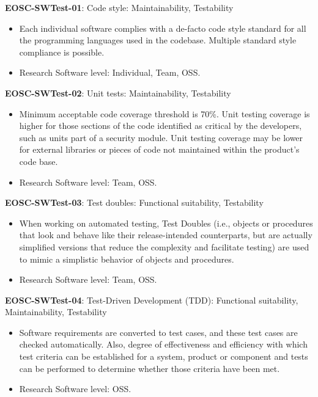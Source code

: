 \textbf{EOSC-SWTest-01}: Code style: Maintainability, Testability

\begin{itemize}
    \item Each individual software complies with a de-facto code style standard for all the programming languages used in the codebase. Multiple standard style compliance is possible. \cite{orviz_set_2017,raymond_software_2013}
    \item Research Software level: Individual, Team, OSS.
\end{itemize}

\textbf{EOSC-SWTest-02}: Unit tests: Maintainability, Testability

\begin{itemize}
    \item Minimum acceptable code coverage threshold is 70\%. Unit testing coverage is higher for those sections of the code identified as critical by the developers, such as units part of a security module. Unit testing coverage may be lower for external libraries or pieces of code not maintained within the product's code base. \cite{aberdour_achieving_2007,nagappan_early_2005,boehm_quantitative_1976,shepherdson_cessda_2019,orviz_set_2017,raymond_software_2013}
    \item Research Software level: Team, OSS.
\end{itemize}

\textbf{EOSC-SWTest-03}: Test doubles: Functional suitability, Testability

\begin{itemize}
    \item When working on automated testing,  Test Doubles (i.e., objects or procedures that look and behave like their release-intended 
counterparts, but are actually simplified versions that reduce the 
complexity and facilitate testing) are used to mimic a simplistic behavior of objects and procedures. \cite{orviz_set_2017,orviz_fernandez_eosc-synergy_2020}
    \item Research Software level: Team, OSS.
\end{itemize}

\textbf{EOSC-SWTest-04}: Test-Driven Development (TDD): Functional suitability, Maintainability, Testability

\begin{itemize}
    \item Software requirements are converted to test cases, and these test cases are checked automatically. Also, degree of effectiveness and efficiency with which test criteria can be established for a system, product or
component and tests can be performed to determine whether those criteria have been met. \cite{iso_25010_2011_2017,crispin_driving_2006,zuser_software_2005,orviz_set_2017}
    \item Research Software level: OSS.
\end{itemize}

